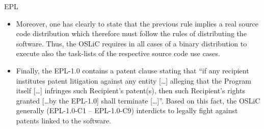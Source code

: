 \begin{license}{EPL}
\begin{itemize}
  \item Moreover, one has clearly to state that the previous rule implies a real
    source code distribution which therefore must follow the rules of
    distributing the software. Thus, the OSLiC requires in all cases of a binary 
    distribution to execute also the task-lists of the respective source code
    use cases. 
 
 	\item Finally, the EPL-1.0 contains a patent clause stating that \enquote{if
 	any recipient institutes patent litigation against any entity [\ldots]
 	alleging that the Program itself [\ldots] infringes such Recipient's
 	patent(s), then such Recipient's rights granted [\ldots by the EPL-1.0] shall
 	terminate [\ldots]}. Based on this fact, the OSLiC generally
 	(EPL-1.0-C1 -- EPL-1.0-C9) interdicts to legally fight against patents linked to the software.
\end{itemize}
\end{license}

%

